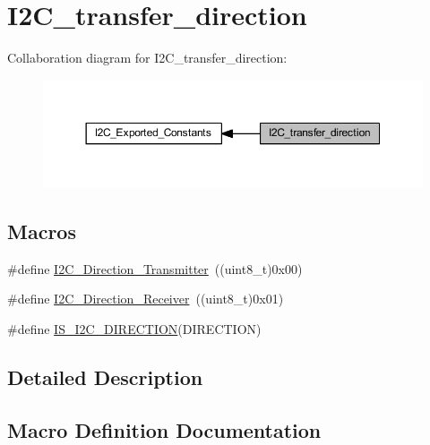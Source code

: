 \hypertarget{group___i2_c__transfer__direction}{}\section{I2\+C\+\_\+transfer\+\_\+direction}
\label{group___i2_c__transfer__direction}
Collaboration diagram for I2\+C\+\_\+transfer\+\_\+direction\+:
\nopagebreak
\begin{figure}[H]
\begin{center}
\leavevmode
\includegraphics[width=350pt]{group___i2_c__transfer__direction}
\end{center}
\end{figure}
\subsection*{Macros}
\begin{DoxyCompactItemize}
\item 
\#define \hyperlink{group___i2_c__transfer__direction_ga9895ee2d7d8cc8ba4daafafa1c3ce1ac}{I2\+C\+\_\+\+Direction\+\_\+\+Transmitter}~((uint8\+\_\+t)0x00)
\item 
\#define \hyperlink{group___i2_c__transfer__direction_gafe3b9b98552980ca56c8e21a90040fa0}{I2\+C\+\_\+\+Direction\+\_\+\+Receiver}~((uint8\+\_\+t)0x01)
\item 
\#define \hyperlink{group___i2_c__transfer__direction_ga33368efe652bc25b4f4b74f02ce0657e}{I\+S\+\_\+\+I2\+C\+\_\+\+D\+I\+R\+E\+C\+T\+I\+ON}(D\+I\+R\+E\+C\+T\+I\+ON)
\end{DoxyCompactItemize}


\subsection{Detailed Description}


\subsection{Macro Definition Documentation}
\mbox{\label{group___i2_c__transfer__direction_gafe3b9b98552980ca56c8e21a90040fa0}} 
